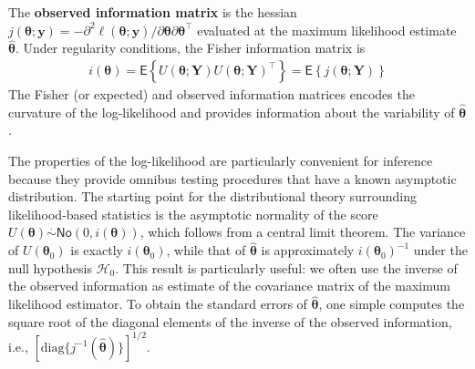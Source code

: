 \documentclass[
  11pt,
  letterpaper,
]{book}
\theoremstyle{definition}
\theoremstyle{definition}
\theoremstyle{definition}
\theoremstyle{remark}
\begin{document}
The \textbf{observed information matrix} is the hessian \(j(\boldsymbol{\theta}; \boldsymbol{y})=-\partial^2 \ell(\boldsymbol{\theta}; \boldsymbol{y})/\partial \boldsymbol{\theta} \partial \boldsymbol{\theta}^\top\) evaluated at the maximum likelihood estimate \(\widehat{\boldsymbol{\theta}}\).
Under regularity conditions, the Fisher information matrix is
\begin{align*}
i(\boldsymbol{\theta}) = \mathsf{E}\left\{U(\boldsymbol{\theta}; \boldsymbol{Y}) U(\boldsymbol{\theta}; \boldsymbol{Y})^\top\right\} = \mathsf{E}\left\{j(\boldsymbol{\theta}; \boldsymbol{Y})\right\}
\end{align*}
The Fisher (or expected) and observed information matrices encodes the curvature of the log-likelihood and provides information about the variability of \(\widehat{\boldsymbol{\theta}}\).

The properties of the log-likelihood are particularly convenient for inference because they provide omnibus testing procedures that have a known asymptotic distribution. The starting point for the distributional theory surrounding likelihood-based statistics is the asymptotic normality of the score \(U(\boldsymbol{\theta}) \stackrel{\cdot}{\sim}\mathsf{No}(0, i(\boldsymbol{\theta}))\), which follows from a central limit theorem. The variance of \(U(\boldsymbol{\theta}_0)\) is exactly \(i(\boldsymbol{\theta}_0)\), while that of \(\widehat{\boldsymbol{\theta}}\) is approximately \(i(\boldsymbol{\theta}_0)^{-1}\) under the null hypothesis \(\mathscr{H}_0\). This result is particularly useful: we often use the inverse of the observed information as estimate of the covariance matrix of the maximum likelihood estimator. To obtain the standard errors of \(\widehat{\boldsymbol{\theta}}\), one simple computes the square root of the diagonal elements of the inverse of the observed information, i.e., \([\mathrm{diag}\{j^{-1}(\widehat{\boldsymbol{\theta}})\}]^{1/2}\).
\end{document}
